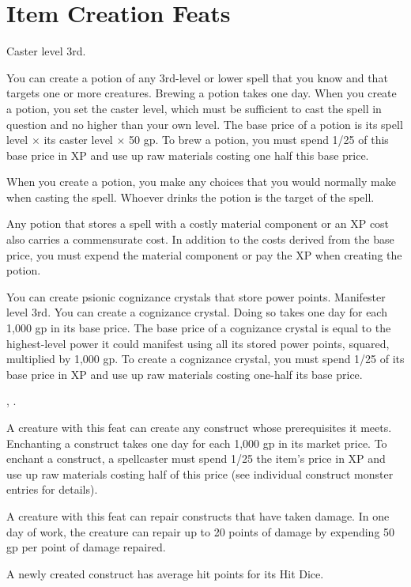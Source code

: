 \section{Item Creation Feats}

{Caster level 3rd.}
{You can create a potion of any 3rd-level or lower spell that you know and that targets one or more creatures. Brewing a potion takes one day. When you create a potion, you set the caster level, which must be sufficient to cast the spell in question and no higher than your own level. The base price of a potion is its spell level $\times$ its caster level $\times$ 50 gp. To brew a potion, you must spend 1/25 of this base price in XP and use up raw materials costing one half this base price.

When you create a potion, you make any choices that you would normally make when casting the spell. Whoever drinks the potion is the target of the spell.

Any potion that stores a spell with a costly material component or an XP cost also carries a commensurate cost. In addition to the costs derived from the base price, you must expend the material component or pay the XP when creating the potion.}

{You can create psionic cognizance crystals that store power points.}
{Manifester level 3rd.}
{You can create a cognizance crystal. Doing so takes one day for each 1,000 gp in its base price. The base price of a cognizance crystal is equal to the highest-level power it could manifest using all its stored power points, squared, multiplied by 1,000 gp. To create a cognizance crystal, you must spend 1/25 of its base price in XP and use up raw materials costing one-half its base price.}{}{}

{, .}
{A creature with this feat can create any construct whose prerequisites it meets. Enchanting a construct takes one day for each 1,000 gp in its market price. To enchant a construct, a spellcaster must spend 1/25 the item’s price in XP and use up raw materials costing half of this price (see individual construct monster entries for details).

A creature with this feat can repair constructs that have taken damage. In one day of work, the creature can repair up to 20 points of damage by expending 50 gp per point of damage repaired.

A newly created construct has average hit points for its Hit Dice.}

